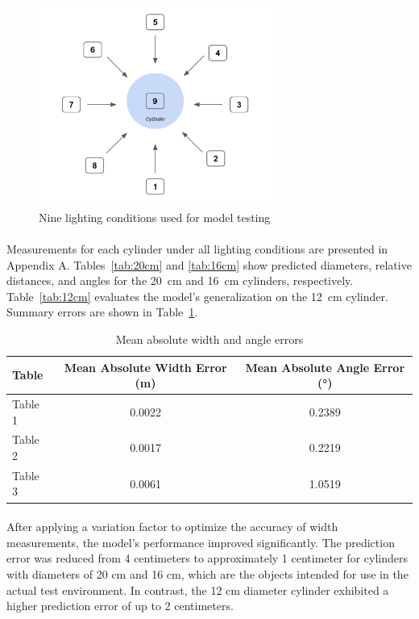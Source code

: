 \begin{figure}[H]
    \centering
    \includegraphics[width=0.7\textwidth]{assets/images/object_detection/fig6.png}
    \caption{Nine lighting conditions used for model testing}
    \label{fig:ligthing conditions}
\end{figure}

\paragraph*{}
Measurements for each cylinder under all lighting conditions are presented in Appendix A. Tables~\ref{tab:20cm} and \ref{tab:16cm} show predicted diameters, relative distances, and angles for the 20~cm and 16~cm cylinders, respectively. Table~\ref{tab:12cm} evaluates the model’s generalization on the 12~cm cylinder. Summary errors are shown in Table~\ref{tab:mean_errors}.

\begin{table}[ht]
    \centering
    
    \label{tab:mean_errors}
    \begin{tabular}{|l|c|c|}
        \hline
        \textbf{Table} & \textbf{Mean Absolute Width Error (m)} & \textbf{Mean Absolute Angle Error (°)} \\
        \hline
        Table 1 & 0.0022 & 0.2389 \\
        Table 2 & 0.0017 & 0.2219 \\
        Table 3 & 0.0061 & 1.0519 \\
        \hline
    \end{tabular}
    \caption{Mean absolute width and angle errors}
\end{table}

\paragraph*{}
After applying a variation factor to optimize the accuracy of width measurements, the model's performance improved significantly. The prediction error was reduced from 4 centimeters to approximately 1 centimeter for cylinders with diameters of 20 cm and 16 cm, which are the objects intended for use in the actual test environment. In contrast, the 12 cm diameter cylinder exhibited a higher prediction error of up to 2 centimeters.

